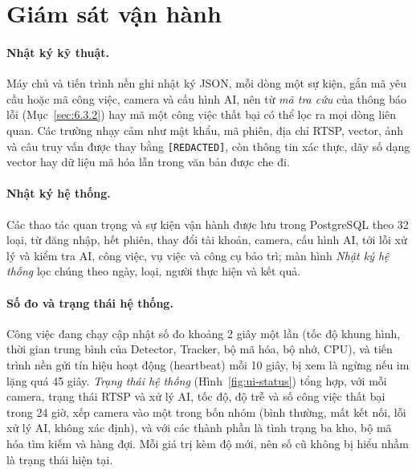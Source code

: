 \section{Giám sát vận hành}
\label{sec:6.4}

\paragraph{Nhật ký kỹ thuật.} Máy chủ và tiến trình nền ghi nhật ký JSON, mỗi dòng một sự kiện, gắn mã yêu cầu hoặc mã công việc, camera và cấu hình AI, nên từ \emph{mã tra cứu} của thông báo lỗi (Mục~\ref{sec:6.3.2}) hay mã một công việc thất bại có thể lọc ra mọi dòng liên quan. Các trường nhạy cảm như mật khẩu, mã phiên, địa chỉ RTSP, vector, ảnh và câu truy vấn được thay bằng \texttt{[REDACTED]}, còn thông tin xác thực, dãy số dạng vector hay dữ liệu mã hóa lẫn trong văn bản được che đi.

\paragraph{Nhật ký hệ thống.} Các thao tác quan trọng và sự kiện vận hành được lưu trong PostgreSQL theo 32 loại, từ đăng nhập, hết phiên, thay đổi tài khoản, camera, cấu hình AI, tới lỗi xử lý và kiểm tra AI, công việc, vụ việc và công cụ bảo trì; màn hình \emph{Nhật ký hệ thống} lọc chúng theo ngày, loại, người thực hiện và kết quả.

\paragraph{Số đo và trạng thái hệ thống.} Công việc đang chạy cập nhật số đo khoảng 2 giây một lần (tốc độ khung hình, thời gian trung bình của Detector, Tracker, bộ mã hóa, bộ nhớ, CPU), và tiến trình nền gửi tín hiệu hoạt động (heartbeat) mỗi 10 giây, bị xem là ngừng nếu im lặng quá 45 giây. \emph{Trạng thái hệ thống} (Hình~\ref{fig:ui-status}) tổng hợp, với mỗi camera, trạng thái RTSP và xử lý AI, tốc độ, độ trễ và số công việc thất bại trong 24 giờ, xếp camera vào một trong bốn nhóm (bình thường, mất kết nối, lỗi xử lý AI, không xác định), và với các thành phần là tình trạng ba kho, bộ mã hóa tìm kiếm và hàng đợi. Mỗi giá trị kèm độ mới, nên số cũ không bị hiểu nhầm là trạng thái hiện tại.
